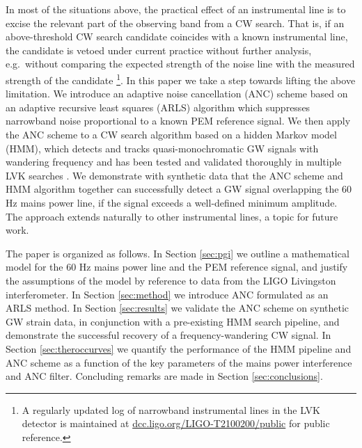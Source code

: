 \documentclass[pra,superscriptaddress,reprint,amsmath,amssymb,nofootinbib]{revtex4-2}
\begin{document}
In most  of the situations above, the practical effect of an instrumental line is to excise the relevant part of the observing band from a CW search. That is, if an above-threshold CW search candidate coincides with a known instrumental line, the candidate is vetoed under current practice without further analysis, e.g.\ without comparing the expected strength of the noise line with the measured strength of the candidate \footnote{A regularly updated log of narrowband instrumental lines in the LVK detector is maintained at \href{https://dcc.ligo.org/LIGO-T2100200/public}{dcc.ligo.org/LIGO-T2100200/public} for public reference.}. In this paper we take a step towards lifting the above limitation. We introduce an adaptive noise cancellation (ANC) scheme  based on an adaptive recursive least squares (ARLS) algorithm which suppresses narrowband noise proportional to a known PEM reference signal. We then apply the ANC scheme to a CW search algorithm based on a hidden Markov model (HMM), which detects and tracks quasi-monochromatic GW signals with wandering frequency and has been tested and validated thoroughly in multiple LVK searches \cite{Suvorova2016PhRv,Piccinni2022,Riles2023,Wette2023}. We demonstrate with synthetic data that the ANC scheme and HMM algorithm together can successfully detect a GW signal overlapping the 60 Hz mains power line, if the signal exceeds a well-defined minimum amplitude. The approach extends naturally to other instrumental lines, a topic for future work. \newline 

The paper is organized as follows. In Section \ref{sec:pgi} we outline a mathematical model for the 60 Hz mains power line and the PEM reference signal, and justify the assumptions of the model by reference to data from the LIGO Livingston interferometer.  In Section \ref{sec:method} we introduce ANC formulated as an ARLS method. In Section \ref{sec:results} we validate the ANC scheme on synthetic GW strain data, in conjunction with a pre-existing HMM search pipeline, and demonstrate the successful recovery of a frequency-wandering CW signal. In Section \ref{sec:theroccurves} we quantify the performance of the HMM pipeline and ANC scheme as a function of the key parameters of the mains power interference and ANC filter. Concluding remarks are made in Section \ref{sec:conclusions}.
\end{document}
